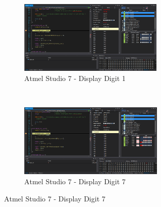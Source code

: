 \documentclass{article}
\begin{document}
\begin{figure}[h!]
		\begin{subfigure}[t]{0.5\textwidth}
			\centering
			\includegraphics[height=3.5cm, width=\linewidth]{./results/lab5_sim_timer0_digit1.png}
			\caption{Αtmel Studio 7 - Display Digit 1}
		\end{subfigure}%
		~
		\begin{subfigure}[t]{0.5\textwidth}
			\centering
			\includegraphics[height=3.5cm, width=\linewidth]{./results/lab5_sim_timer0_digit7.png}
			\caption{Αtmel Studio 7 - Display Digit 7}
		\end{subfigure}	
	\end{figure}	
\end{document}
